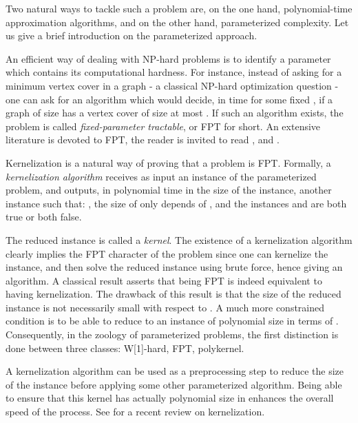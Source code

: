 \documentclass{article}
\begin{document}
Two natural ways to tackle such a problem are, on the one hand, polynomial-time approximation algorithms, and on the other hand, parameterized complexity. Let us give a brief introduction on the parameterized approach.


\vspace{12pt}

An efficient way of dealing with NP-hard problems
is to identify a parameter which contains its 
computational hardness. For instance, instead 
of asking for a minimum vertex cover in a graph -
a classical NP-hard optimization question - one
can ask for an algorithm which would decide, in
 time for some fixed , if a graph 
of size  has a  vertex cover of size at 
most . If such an algorithm exists, the problem
is called {\it fixed-parameter tractable}, or FPT for 
short. An extensive literature is devoted to FPT, 
the reader is invited to read \cite{DowneyFellows}, \cite{FlumGrohe}
and \cite{NiedBookFPT}.

Kernelization is a natural way of proving that a 
problem is FPT. Formally, a {\it kernelization algorithm}
receives as input an instance  of the parameterized
problem, and outputs, in polynomial time  in the size of 
the instance, another instance  such that: , the size of  only depends of , and the instances  and  are both true or both false.



The reduced instance  is called a {\it kernel}.
The existence of a kernelization algorithm 
clearly implies the FPT character of the problem since 
one can kernelize the instance, and then solve the reduced
instance  using brute force, hence giving an 
 algorithm. 
A classical result asserts that being FPT is indeed equivalent to 
having kernelization. The drawback of this result is that 
the size of the reduced instance  is not necessarily 
small with respect to . A much more constrained condition
is to be able to reduce to an instance of polynomial 
size in terms of . Consequently, in the zoology of parameterized 
problems, the first distinction is done between three classes: 
W[1]-hard, FPT, polykernel. 

A kernelization algorithm can be used as a preprocessing step to reduce the size of the instance before applying some other parameterized algorithm. Being able to ensure that this kernel has actually polynomial size in  enhances the overall speed of the process. See \cite{GuoNiedFPT} for a recent review on kernelization.


\vspace{12pt}
\end{document}
